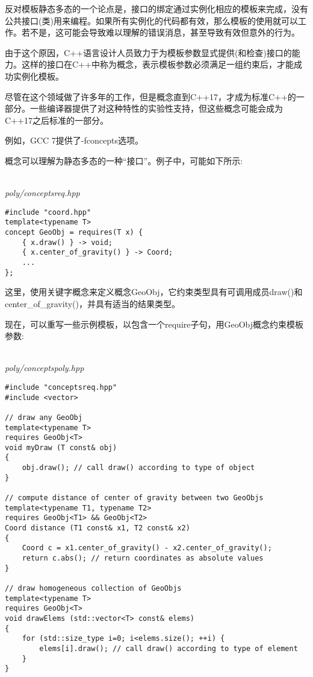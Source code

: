 反对模板静态多态的一个论点是，接口的绑定通过实例化相应的模板来完成，没有公共接口(类)用来编程。如果所有实例化的代码都有效，那么模板的使用就可以工作。若不是，这可能会导致难以理解的错误消息，甚至导致有效但意外的行为。

由于这个原因，C++语言设计人员致力于为模板参数显式提供(和检查)接口的能力。这样的接口在C++中称为概念，表示模板参数必须满足一组约束后，才能成功实例化模板。

尽管在这个领域做了许多年的工作，但是概念直到C++17，才成为标准C++的一部分。一些编译器提供了对这种特性的实验性支持，但这些概念可能会成为C++17之后标准的一部分。

\begin{tcolorbox}[colback=webgreen!5!white,colframe=webgreen!75!black]
\hspace*{0.75cm}例如，GCC 7提供了-fconcepts选项。
\end{tcolorbox}

概念可以理解为静态多态的一种“接口”。例子中，可能如下所示:

\hspace*{\fill} \\ %
\noindent
\textit{poly/conceptsreq.hpp}
\begin{lstlisting}[style=styleCXX]
#include "coord.hpp"
template<typename T>
concept GeoObj = requires(T x) {
	{ x.draw() } -> void;
	{ x.center_of_gravity() } -> Coord;
	...
};
\end{lstlisting}

这里，使用关键字概念来定义概念GeoObj，它约束类型具有可调用成员draw()和center\_of\_gravity()，并具有适当的结果类型。

现在，可以重写一些示例模板，以包含一个require子句，用GeoObj概念约束模板参数:

\hspace*{\fill} \\ %
\noindent
\textit{poly/conceptspoly.hpp}
\begin{lstlisting}[style=styleCXX]
#include "conceptsreq.hpp"
#include <vector>

// draw any GeoObj
template<typename T>
requires GeoObj<T>
void myDraw (T const& obj)
{
	obj.draw(); // call draw() according to type of object
}

// compute distance of center of gravity between two GeoObjs
template<typename T1, typename T2>
requires GeoObj<T1> && GeoObj<T2>
Coord distance (T1 const& x1, T2 const& x2)
{
	Coord c = x1.center_of_gravity() - x2.center_of_gravity();
	return c.abs(); // return coordinates as absolute values
}

// draw homogeneous collection of GeoObjs
template<typename T>
requires GeoObj<T>
void drawElems (std::vector<T> const& elems)
{
	for (std::size_type i=0; i<elems.size(); ++i) {
		elems[i].draw(); // call draw() according to type of element
	}
}
\end{lstlisting}

